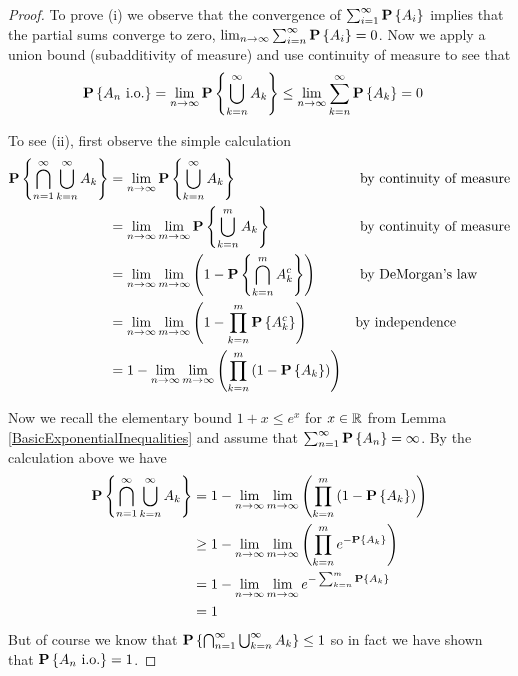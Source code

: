 \begin{proof}
To prove (i) we observe that the convergence of $\sum_{i=1}^\infty
\textbf{P}\left \{A_i \right \}$ implies that the partial sums converge to zero,
$\lim_{n\to \infty} \sum_{i=n}^\infty
\textbf{P}\left \{A_i \right \} = 0$.  Now we apply a union bound (subadditivity of
measure) and use continuity of measure to see that
\begin{align*}
\textbf{P}\left \{A_n \text{ i.o.} \right \} &= \lim_{n\to \infty}
\textbf{P}\left \{\bigcup_{k=n}^\infty A_k \right \}  \leq  \lim_{n\to \infty} \sum_{k=n}^\infty \textbf{P}\left \{A_k \right \} = 0
\end{align*}

To see (ii), first observe the simple calculation
\begin{align*}
\textbf{P}\left \{\bigcap_{n=1}^\infty \bigcup_{k=n}^\infty A_k \right \} &=
\lim_{n\to \infty} \textbf{P}\left \{\bigcup_{k=n}^\infty A_k \right \}  & &\text{ by continuity of measure}\\
&= \lim_{n\to \infty} \lim_{m\to \infty} \textbf{P}\left \{\bigcup_{k=n}^m
  A_k \right \} & &\text{ by continuity of measure}\\
&= \lim_{n\to \infty} \lim_{m\to \infty} \left ( 1 - \textbf{P}\left \{\bigcap_{k=n}^m
  A_k^c \right \} \right ) & &\text{ by DeMorgan's law} \\
&= \lim_{n\to \infty} \lim_{m\to \infty}\left ( 1 - \prod_{k=n}^m\textbf{P}\left \{
  A_k^c \right \} \right )& &\text{by independence} \\
&=  1 - \lim_{n\to \infty} \lim_{m\to \infty}\left (\prod_{k=n}^m\left
    (1 - \textbf{P}\left \{
  A_k \right \} \right) \right ) \\
\end{align*}

Now we recall the 
elementary bound $1+x \leq e^x$ for $x \in \mathbb{R}$ from Lemma
\ref{BasicExponentialInequalities} and assume that
$\sum_{n=1}^\infty \textbf{P}\left \{A_n \right \} = \infty$.  By the calculation
above we have
\begin{align*}
\textbf{P}\left \{\bigcap_{n=1}^\infty \bigcup_{k=n}^\infty A_k \right \} &= 1 - \lim_{n\to \infty} \lim_{m\to \infty}\left (\prod_{k=n}^m\left
    (1 - \textbf{P}\left \{
  A_k \right \} \right) \right ) \\
&\geq 1 - \lim_{n\to \infty} \lim_{m\to \infty}\left (\prod_{k=n}^m
   e^{- \textbf{P}\left \{
  A_k \right \}} \right ) \\
&= 1 - \lim_{n\to \infty} \lim_{m\to \infty}
   e^{- \sum_{k=n}^m\textbf{P}\left \{
  A_k \right \}} \\
&= 1
\end{align*}
But of course we know that $\textbf{P}\left \{\bigcap_{n=1}^\infty
  \bigcup_{k=n}^\infty A_k \right \} \leq 1$ so in fact we have shown that
$\textbf{P}\left \{A_n \text{ i.o.} \right \} = 1$.
\end{proof}

